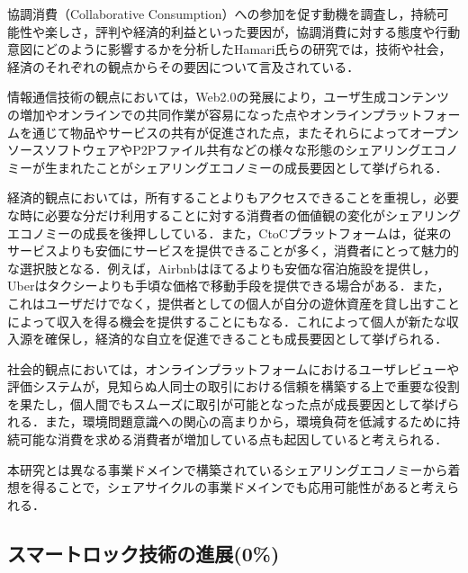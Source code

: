          \par 協調消費（Collaborative Consumption）への参加を促す動機を調査し，持続可能性や楽しさ，評判や経済的利益といった要因が，協調消費に対する態度や行動意図にどのように影響するかを分析したHamari氏らの研究では，技術や社会，経済のそれぞれの観点からその要因について言及されている．
          \par 情報通信技術の観点においては，Web2.0の発展により，ユーザ生成コンテンツの増加やオンラインでの共同作業が容易になった点やオンラインプラットフォームを通じて物品やサービスの共有が促進された点，またそれらによってオープンソースソフトウェアやP2Pファイル共有などの様々な形態のシェアリングエコノミーが生まれたことがシェアリングエコノミーの成長要因として挙げられる．
          \par 経済的観点においては，所有することよりもアクセスできることを重視し，必要な時に必要な分だけ利用することに対する消費者の価値観の変化がシェアリングエコノミーの成長を後押ししている．また，CtoCプラットフォームは，従来のサービスよりも安価にサービスを提供できることが多く，消費者にとって魅力的な選択肢となる．例えば，Airbnbはほてるよりも安価な宿泊施設を提供し，Uberはタクシーよりも手頃な価格で移動手段を提供できる場合がある．また，これはユーザだけでなく，提供者としての個人が自分の遊休資産を貸し出すことによって収入を得る機会を提供することにもなる．これによって個人が新たな収入源を確保し，経済的な自立を促進できることも成長要因として挙げられる．
          \par 社会的観点においては，オンラインプラットフォームにおけるユーザレビューや評価システムが，見知らぬ人同士の取引における信頼を構築する上で重要な役割を果たし，個人間でもスムーズに取引が可能となった点が成長要因として挙げられる．また，環境問題意識への関心の高まりから，環境負荷を低減するために持続可能な消費を求める消費者が増加している点も起因していると考えられる．
          \par 本研究とは異なる事業ドメインで構築されているシェアリングエコノミーから着想を得ることで，シェアサイクルの事業ドメインでも応用可能性があると考えられる．
      
  \subsection{スマートロック技術の進展(0\%)}
    \label{sec:スマートロック技術の進展}
      \par

